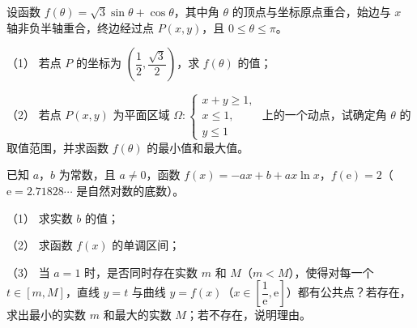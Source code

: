 \begin{question}
设函数 $f(\theta)=\sqrt3\sin\theta+\cos\theta$，其中角 $\theta$ 的顶点与坐标原点重合，始边与 $x$ 轴非负半轴重合，终边经过点 $P(x,y)$，且 $0\leqslant\theta\leqslant\pi$。

（1） 若点 $P$ 的坐标为 $\left(\dfrac12,\dfrac{\sqrt3}2\right)$，求 $f(\theta)$ 的值；

（2） 若点 $P(x,y)$ 为平面区域 $\Omega:\begin{cases}x+y\geqslant1,\\x\leqslant1,\\y\leqslant1\end{cases}$ 上的一个动点，试确定角 $\theta$ 的取值范围，并求函数 $f(\theta)$ 的最小值和最大值。

\end{question}
\begin{question}
已知 $a$，$b$ 为常数，且 $a\neq0$，函数 $f(x)=-ax+b+ax\ln x$，$f(\mathrm e)=2$（$\mathrm e=2.71828\cdots$ 是自然对数的底数）。

（1） 求实数 $b$ 的值；

（2） 求函数 $f(x)$ 的单调区间；

（3） 当 $a=1$ 时，是否同时存在实数 $m$ 和 $M$（$m<M$），使得对每一个 $t\in[m,M]$，直线 $y=t$ 与曲线 $y=f(x)$（$x\in\left[\dfrac1{\mathrm e},\mathrm e\right]$）都有公共点？若存在，求出最小的实数 $m$ 和最大的实数 $M$；若不存在，说明理由。

\end{question}
